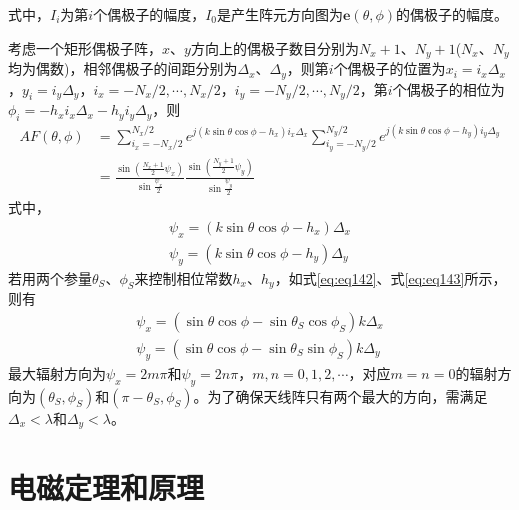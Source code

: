 \documentclass{article}
\numberwithin{equation}{section}
\renewcommand{\vec}[1]{\boldsymbol{#1}}
\begin{document}
式中，$I_i$为第$i$个偶极子的幅度，$I_0$是产生阵元方向图为$\vec{e}(\theta,\phi)$的偶极子的幅度。
\par
考虑一个矩形偶极子阵，$x$、$y$方向上的偶极子数目分别为$N_x+1$、$N_y+1$($N_x$、$N_y$均为偶数)，相邻偶极子的间距分别为$\Delta_x$、$\Delta_y$，则第$i$个偶极子的位置为$x_i=i_x\Delta_x$，$y_i=i_y\Delta_y$，$i_x=-N_x/2,\cdots,N_x/2$，$i_y=-N_y/2,\cdots,N_y/2$，第$i$个偶极子的相位为$\phi_i=-h_xi_x\Delta_x-h_yi_y\Delta_y$，则
\begin{align}
    \label{eq:eq153}
    AF(\theta,\phi)&=\sum_{i_x=-N_x/2}^{N_x/2}e^{j(k\sin\theta\cos\phi-h_x)i_x\Delta_x}\sum_{i_y=-N_y/2}^{N_y/2}e^{j(k\sin\theta\cos\phi-h_y)i_y\Delta_y} \nonumber \\
                   &=\frac{\sin\left(\frac{N_x+1}{2}\psi_x\right)}{\sin\frac{\psi_x}{2}}\frac{\sin\left(\frac{N_y+1}{2}\psi_y\right)}{\sin\frac{\psi_y}{2}}
\end{align}
式中，
\begin{align}
    \label{eq:eq154}
    \psi_x=(k\sin\theta\cos\phi-h_x)\Delta_x \\
    \label{eq:eq155}
    \psi_y=(k\sin\theta\cos\phi-h_y)\Delta_y
\end{align}
若用两个参量$\theta_{S}$、$\phi_{S}$来控制相位常数$h_x$、$h_y$，如式\ref{eq:eq142}、式\ref{eq:eq143}所示，则有
\begin{align}
    \label{eq:eq158}
    \psi_x=(\sin\theta\cos\phi-\sin\theta_{S}\cos\phi_{S})k\Delta_x \\
    \label{eq:eq159}
    \psi_y=(\sin\theta\cos\phi-\sin\theta_{S}\sin\phi_{S})k\Delta_y
\end{align}
最大辐射方向为$\psi_x=2m\pi$和$\psi_y=2n\pi$，$m,n=0,1,2,\cdots$，对应$m=n=0$的辐射方向为$(\theta_S,\phi_S)$和$(\pi-\theta_S,\phi_S)$。为了确保天线阵只有两个最大的方向，需满足$\Delta_x<\lambda$和$\Delta_y<\lambda$。
\section{\textsf{电磁定理和原理}}
\end{document}
